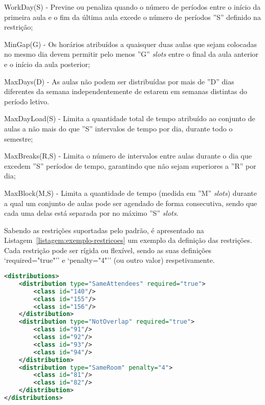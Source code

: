 \begin{compactitem}
    \item WorkDay(S) - Previne ou penaliza quando o número de períodos entre o início da primeira aula e o fim da última aula excede o número de períodos ''S'' definido na restrição;

    \item MinGap(G) - Os horários atribuídos a quaisquer duas aulas que sejam colocadas no mesmo dia devem permitir pelo menos ''G'' \textit{slots} entre o final da aula anterior e o início da aula posterior;

    \item MaxDays(D) - As aulas não podem ser distribuídas por mais de ''D'' dias diferentes da semana independentemente de estarem em semanas distintas do período letivo.

    \item MaxDayLoad(S) - Limita a quantidade total de tempo atribuído ao conjunto de aulas a não mais do que ''S'' intervalos de tempo por dia, durante todo o semestre;

    \item MaxBreaks(R,S) - Limita o número de intervalos entre aulas durante o dia que excedem ''S'' períodos de tempo, garantindo que não sejam superiores a ''R'' por dia;

    \item MaxBlock(M,S) - Limita a quantidade de tempo (medida em ''M'' \textit{slots}) durante a qual um conjunto de aulas pode ser agendado de forma consecutiva, sendo que cada uma delas está separada por no máximo ''S'' \textit{slots}.
\end{compactitem}

Sabendo as restrições suportadas pelo padrão, é apresentado na Listagem~\ref{listagem:exemplo-restricoes} um exemplo da definição das restrições. Cada restrição pode ser rígida ou flexível, sendo as suas definições `required="true"'' e `penalty="4"'' (ou outro valor) respetivamente.

\begin{lstlisting}[language=XML, float, caption={Exemplo da definição das restrições.}, label={listagem:exemplo-restricoes}]
<distributions>
    <distribution type="SameAttendees" required="true">
        <class id="140"/>
        <class id="155"/>
        <class id="156"/>
    </distribution>
    <distribution type="NotOverlap" required="true">
        <class id="91"/>
        <class id="92"/>
        <class id="93"/>
        <class id="94"/>
    </distribution>
    <distribution type="SameRoom" penalty="4">
        <class id="81"/>
        <class id="82"/>
    </distribution>
</distributions>
\end{lstlisting}

